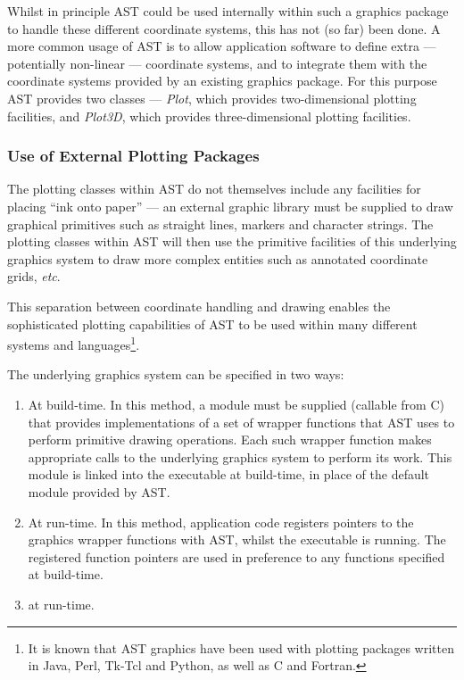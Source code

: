 \documentclass[final,authoryear,5p,times,twocolumn]{elsarticle}
\begin{document}
Whilst in principle AST could be used internally within such a graphics
package to handle these different coordinate systems, this has not (so
far) been done. A more common usage of AST is to allow application
software to define extra --- potentially non-linear --- coordinate
systems, and to integrate them with the coordinate systems provided by an
existing graphics package. For this purpose AST provides two classes ---
\emph{Plot}, which provides two-dimensional plotting facilities, and
\emph{Plot3D}, which provides three-dimensional plotting facilities.

\subsubsection{Use of External Plotting Packages}
The plotting classes within AST do not themselves include any facilities
for placing ``ink onto paper'' --- an external graphic library must be
supplied to draw graphical primitives such as straight lines, markers and
character strings. The plotting classes within AST will then use the
primitive facilities of this underlying graphics system to draw more complex
entities such as annotated coordinate grids, \emph{etc}.

This separation between coordinate handling and drawing enables the
sophisticated plotting capabilities of AST to be used within many
different systems and languages\footnote{It is known that AST graphics
have been used with plotting packages written in Java, Perl, Tk-Tcl and
Python, as well as C and Fortran.}.

The underlying graphics system can be specified in two ways:

\begin{enumerate}
\item At build-time. In this method, a module must be supplied (callable from
C) that provides implementations of a set of wrapper functions that AST
uses to perform primitive drawing operations. Each such wrapper function
makes appropriate calls to the underlying graphics system to perform its
work. This module is linked into the executable at build-time, in place
of the default module provided by AST.
\item At run-time. In this method, application code registers pointers to
the graphics wrapper functions with AST, whilst the executable is running.
The registered function pointers are used in preference to any functions
specified at build-time.
\item at run-time.
\end{enumerate}
\end{document}
